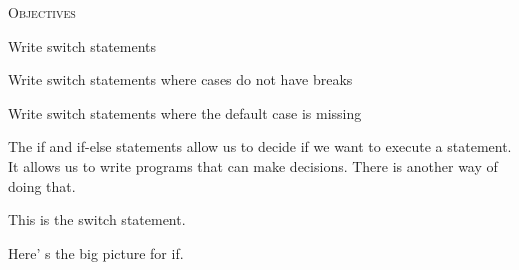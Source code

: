 \newpage{}

\textsc{Objectives}

\begin{tightlist}
\item
  Write switch statements
\item
  Write switch statements where cases do not have breaks
\item
  Write switch statements where the default case is missing
\end{tightlist}

The if and if-else statements allow us to decide if we want to execute a
statement. It allows us to write programs that can make decisions. There
is another way of doing that.

This is the switch statement.

\newpage{}

Here' s the big picture for if.

